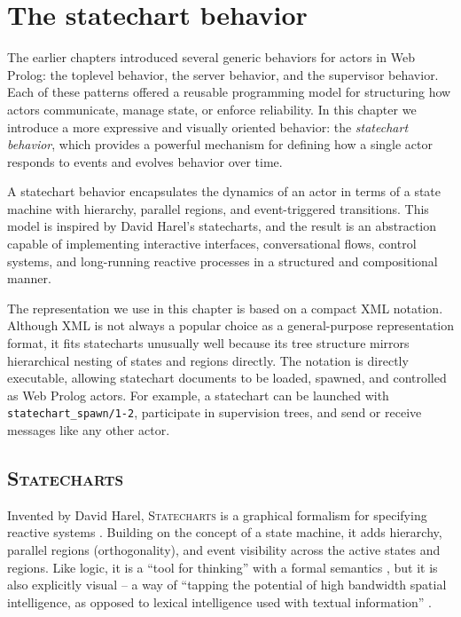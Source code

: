 \chapter{The statechart behavior}
\label{sec:web-prolog-statechart-behavior}

The earlier chapters introduced several generic behaviors for actors in Web Prolog: the toplevel behavior, the server behavior, and the supervisor behavior. Each of these patterns offered a reusable programming model for structuring how actors communicate, manage state, or enforce reliability. In this chapter we introduce a more expressive and visually oriented behavior: the \emph{statechart behavior}, which provides a powerful mechanism for defining how a single actor responds to events and evolves behavior over time.

A statechart behavior encapsulates the dynamics of an actor in terms of a state machine with hierarchy, parallel regions, and event-triggered transitions. This model is inspired by David Harel's statecharts, and the result is an abstraction capable of implementing interactive interfaces, conversational flows, control systems, and long-running reactive processes in a structured and compositional manner.

The representation we use in this chapter is based on a compact XML notation. Although XML is not always a popular choice as a general-purpose representation format, it fits statecharts unusually well because its tree structure mirrors hierarchical nesting of states and regions directly. The notation is directly executable, allowing statechart documents to be loaded, spawned, and controlled as Web Prolog actors. For example, a statechart can be launched with \texttt{statechart\_spawn/1-2}, participate in supervision trees, and send or receive messages like any other actor.


\section{\textsc{Statecharts}}\label{sec:statecharts-behavior}

\noindent Invented by David Harel, \textsc{Statecharts} is a graphical formalism for specifying reactive systems \cite{DBLP:journals/scp/Harel87}. Building on the concept of a state machine, it adds hierarchy, parallel regions (orthogonality), and event visibility across the active states and regions.
Like logic, it is a ``tool for thinking'' with a formal semantics \cite{harel1996semantics}, but it is also explicitly visual -- a way of ``tapping the potential of high bandwidth spatial intelligence, as opposed to lexical intelligence used with textual information'' \cite{samek2002practical}.

